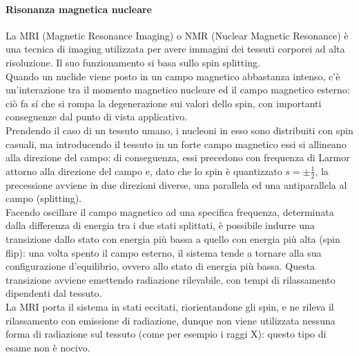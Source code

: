 \paragraph{Risonanza magnetica nucleare}

La MRI (Magnetic Resonance Imaging) o NMR (Nuclear Magnetic Resonance) è una tecnica di imaging utilizzata per avere immagini dei tessuti corporei ad alta risoluzione. Il suo funzionamento si basa sullo spin splitting.\\
Quando un nuclide viene posto in un campo magnetico abbastanza intenso, c'è un'interazione tra il momento magnetico nucleare ed il campo magnetico esterno: ciò fa sí che si rompa la degenerazione sui valori dello spin, con importanti conseguenze dal punto di vista applicativo.\\
Prendendo il caso di un tessuto umano, i nucleoni in esso sono distribuiti con spin casuali, ma introducendo il tessuto in un forte campo magnetico essi si allineano alla direzione del campo: di conseguenza, essi precedono con frequenza di Larmor \footnotemark attorno alla direzione del campo e, dato che lo spin è quantizzato $ s = \pm\frac{1}{2} $, la precessione avviene in due direzioni diverse, una parallela ed una antiparallela al campo (splitting).\\
Facendo oscillare il campo magnetico ad una specifica frequenza, determinata dalla differenza di energia tra i due stati splittati, è possibile indurre una transizione dallo stato con energia più bassa a quello con energia più alta (spin flip): una volta spento il campo esterno, il sistema tende a tornare alla sua configurazione d'equilibrio, ovvero allo stato di energia più bassa. Questa transizione avviene emettendo radiazione rilevabile, con tempi di rilassamento dipendenti dal tessuto.\\
La MRI porta il sistema in stati eccitati, riorientandone gli spin, e ne rileva il rilassamento con emissione di radiazione, dunque non viene utilizzata nessuna forma di radiazione sul tessuto (come per esempio i raggi X): questo tipo di esame non è nocivo.











